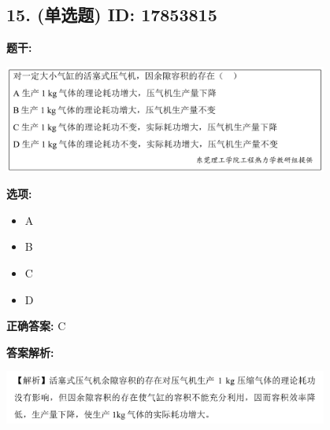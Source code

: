 \documentclass[12pt]{article}
\begin{document}
\subsection*{15. (单选题) \small ID: 17853815}

\textbf{题干:}


\begin{center}\includegraphics[width=0.8\textwidth, height=0.25\textheight, keepaspectratio]{question_15_17853815/title_img_1.png}\end{center}

\textbf{选项:}
\begin{itemize}[leftmargin=*]
  \item A

  \item B

  \item C

  \item D

\end{itemize}

\textbf{正确答案:}
C

\textbf{答案解析:}


\begin{center}\includegraphics[width=0.8\textwidth, height=0.25\textheight, keepaspectratio]{question_15_17853815/correct_replay_img_1.png}\end{center}

\vspace{0.5em}\hrulefill\vspace{1em}
\end{document}
